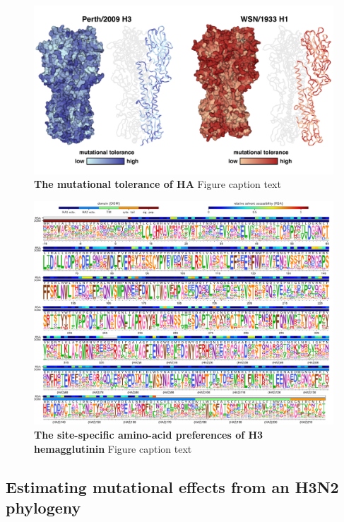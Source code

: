 \documentclass[11pt]{article}
\begin{document}
\begin{figure}
\centerline{\includegraphics[width=\textwidth]{figs/mut_tolerance/entropy_heatmap.pdf}}
\caption{\label{fig:mut_tolerance}
{\bf The mutational tolerance of HA}
Figure caption text
}
\end{figure}

\begin{figure}
\centerline{\includegraphics[width=\textwidth]{figs/prefslogoplot/rescaled-avgprefs_prefs.pdf}}
\caption{\label{fig:logoplot}
{\bf The site-specific amino-acid preferences of H3 hemagglutinin}
Figure caption text
}
\end{figure}


\subsection*{Estimating mutational effects from an H3N2 phylogeny}
\end{document}

